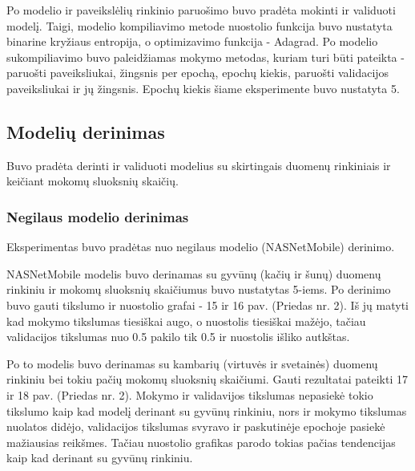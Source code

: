 \documentclass{VUMIFPSbakalaurinis}
\begin{document}
Po modelio ir paveikslėlių rinkinio paruošimo buvo pradėta mokinti ir validuoti modelį. Taigi, modelio kompiliavimo metode nuostolio 
funkcija buvo nustatyta binarine kryžiaus entropija, o optimizavimo funkcija - Adagrad. Po modelio sukompiliavimo buvo paleidžiamas mokymo metodas, kuriam turi būti pateikta - paruošti paveiksliukai, žingsnis per epochą, epochų kiekis, 
paruošti validacijos paveiksliukai ir jų žingsnis. Epochų kiekis šiame eksperimente buvo nustatyta 5.

\subsection{Modelių derinimas}
Buvo pradėta derinti ir validuoti modelius su skirtingais duomenų rinkiniais ir keičiant mokomų sluoksnių skaičių.

\subsubsection{Negilaus modelio derinimas}
Eksperimentas buvo pradėtas nuo negilaus modelio (NASNetMobile) derinimo.

NASNetMobile modelis buvo derinamas su gyvūnų (kačių ir šunų) duomenų rinkiniu ir mokomų sluoksnių skaičiumus buvo nustatytas 5-iems.
Po derinimo buvo gauti tikslumo ir nuostolio grafai - 15 ir 16 pav. (Priedas nr. 2). Iš jų matyti kad mokymo tikslumas tiesiškai augo, o nuostolis tiesiškai mažėjo, tačiau validacijos tikslumas nuo 0.5 pakilo tik 0.5 ir nuostolis išliko autkštas.

Po to modelis buvo derinamas su kambarių (virtuvės ir svetainės) duomenų rinkiniu bei tokiu pačių mokomų sluoksnių skaičiumi.
Gauti rezultatai pateikti 17 ir 18 pav. (Priedas nr. 2). Mokymo ir validavijos tikslumas nepasiekė tokio tikslumo kaip kad modelį derinant su gyvūnų rinkiniu, nors ir mokymo tikslumas nuolatos didėjo, validacijos tikslumas svyravo ir paskutinėje epochoje pasiekė mažiausias reikšmes. Tačiau nuostolio grafikas parodo tokias pačias tendencijas kaip kad derinant su gyvūnų rinkiniu.
\end{document}

